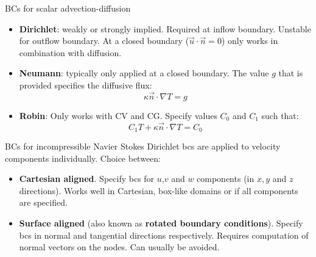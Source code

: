 \documentclass[12pt]{beamer}
\newcommand\grad\nabla
\renewcommand\emph[1]{{\bf #1}}
\begin{document}
\begin{frame}{BCs for scalar advection-diffusion}
  \begin{itemize}
    \item {\bf Dirichlet}: weakly or strongly implied. Required at inflow
      boundary. Unstable for outflow boundary. At a closed boundary ($\vec
      u\cdot\vec n=0$) only works
      in combination with diffusion.
    \item {\bf Neumann}: typically only applied at a closed boundary. The value
      $g$ that is provided specifies the diffusive flux:
      \begin{equation*}
        \kappa \vec n\cdot\grad T = g
      \end{equation*}
    \item {\bf Robin}: Only works with CV and CG. Specify values $C_0$ and $C_1$ such that:
      \begin{equation*}
        C_1 T + \kappa \vec n\cdot\grad T = C_0
      \end{equation*}
  \end{itemize}
\end{frame}

\begin{frame}{BCs for incompressible Navier Stokes}
  Dirichlet bcs are applied to velocity components individually. Choice between:
  \begin{itemize}
    \item \emph{Cartesian aligned}. Specify bcs for $u$,$v$ and $w$ components (in
      $x, y$ and $z$ directions). Works well in Cartesian, box-like domains or
      if all components are specified.
    \item \emph{Surface aligned} (also known as \emph{rotated boundary
      conditions}). Specify bcs in normal and tangential directions
      respectively. Requires computation of normal vectors on the nodes. Can usually be
      avoided.
  \end{itemize}
\end{frame}
\end{document}
